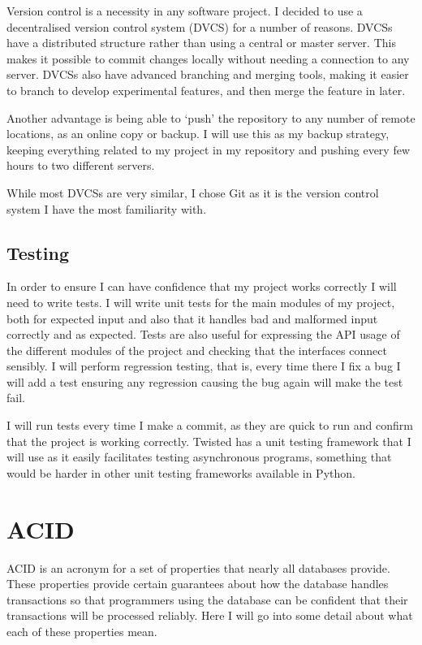 \documentclass[12pt,twoside,notitlepage]{report}
\begin{document}
Version control is a necessity in any software project. I decided to use a decentralised version
control system (DVCS) for a number of reasons. DVCSs have a distributed structure rather than
using a central or master server. This makes it possible to commit changes locally without needing
a connection to any server. DVCSs also have advanced branching and merging tools, making it easier
to branch to develop experimental features, and then merge the feature in later.

Another advantage is being able to `push' the repository to any number of remote locations, as
an online copy or backup. I will use this as my backup strategy, keeping everything related to
my project in my repository and pushing every few hours to two different servers.

While most DVCSs are very similar, I chose Git as it is the version control system I have the most
familiarity with.

\subsection{Testing}

In order to ensure I can have confidence that my project works correctly I will need to write
tests. I will write unit tests for the main modules of my project, both for expected input and
also that it handles bad and malformed input correctly and as expected. Tests are also useful for
expressing the API usage of the different modules of the project and checking that the interfaces
connect sensibly. I will perform regression testing, that is, every time there I fix a bug I will
add a test ensuring any regression causing the bug again will make the test fail.

I will run tests every time I make a commit, as they are quick to run and confirm that the project
is working correctly. Twisted has a unit testing framework that I will use as it easily
facilitates testing asynchronous programs, something that would be harder in other unit testing
frameworks available in Python.

\section{ACID}

ACID is an acronym for a set of properties that nearly all databases provide. These properties
provide certain guarantees about how the database handles transactions so that programmers using
the database can be confident that their transactions will be processed reliably. Here I will go
into some detail about what each of these properties mean.
\end{document}

